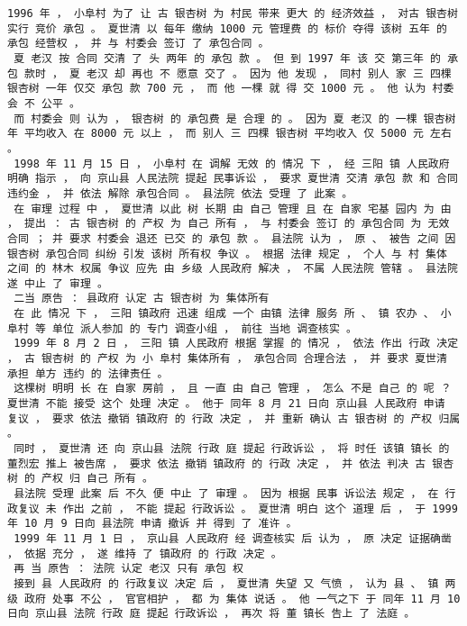 \documentclass{article}
\begin{document}
\begin{Verbatim}[commandchars=\\\{\}]
 1996 年 ， 小阜村 为了 让 古 银杏树 为 村民 带来 更大 的 经济效益 ， 对古 银杏树 实行 竞价 承包 。 夏世清 以 每年 缴纳 1000 元 管理费 的 标价 夺得 该树 五年 的 承包 经营权 ， 并 与 村委会 签订 了 承包合同 。 
 夏 老汉 按 合同 交清 了 头 两年 的 承包 款 。 但 到 1997 年 该 交 第三年 的 承包 款时 ， 夏 老汉 却 再也 不 愿意 交了 。 因为 他 发现 ， 同村 别人 家 三 四棵 银杏树 一年 仅交 承包 款 700 元 ， 而 他 一棵 就 得 交 1000 元 。 他 认为 村委会 不 公平 。 
 而 村委会 则 认为 ， 银杏树 的 承包费 是 合理 的 。 因为 夏 老汉 的 一棵 银杏树 年 平均收入 在 8000 元 以上 ， 而 别人 三 四棵 银杏树 平均收入 仅 5000 元 左右 。 
 1998 年 11 月 15 日 ， 小阜村 在 调解 无效 的 情况 下 ， 经 三阳 镇 人民政府 明确 指示 ， 向 京山县 人民法院 提起 民事诉讼 ， 要求 夏世清 交清 承包 款 和 合同 违约金 ， 并 依法 解除 承包合同 。 县法院 依法 受理 了 此案 。 
 在 审理 过程 中 ， 夏世清 以此 树 长期 由 自己 管理 且 在 自家 宅基 园内 为 由 ， 提出 ： 古 银杏树 的 产权 为 自己 所有 ， 与 村委会 签订 的 承包合同 为 无效 合同 ； 并 要求 村委会 退还 已交 的 承包 款 。 县法院 认为 ， 原 、 被告 之间 因 银杏树 承包合同 纠纷 引发 该树 所有权 争议 。 根据 法律 规定 ， 个人 与 村 集体 之间 的 林木 权属 争议 应先 由 乡级 人民政府 解决 ， 不属 人民法院 管辖 。 县法院 遂 中止 了 审理 。 
 二当 原告 ： 县政府 认定 古 银杏树 为 集体所有 
 在 此 情况 下 ， 三阳 镇政府 迅速 组成 一个 由镇 法律 服务 所 、 镇 农办 、 小阜村 等 单位 派人参加 的 专门 调查小组 ， 前往 当地 调查核实 。 
 1999 年 8 月 2 日 ， 三阳 镇 人民政府 根据 掌握 的 情况 ， 依法 作出 行政 决定 ， 古 银杏树 的 产权 为 小 阜村 集体所有 ， 承包合同 合理合法 ， 并 要求 夏世清 承担 单方 违约 的 法律责任 。 
 这棵树 明明 长 在 自家 房前 ， 且 一直 由 自己 管理 ， 怎么 不是 自己 的 呢 ？ 夏世清 不能 接受 这个 处理 决定 。 他于 同年 8 月 21 日向 京山县 人民政府 申请 复议 ， 要求 依法 撤销 镇政府 的 行政 决定 ， 并 重新 确认 古 银杏树 的 产权 归属 。 
 同时 ， 夏世清 还 向 京山县 法院 行政 庭 提起 行政诉讼 ， 将 时任 该镇 镇长 的 董烈宏 推上 被告席 ， 要求 依法 撤销 镇政府 的 行政 决定 ， 并 依法 判决 古 银杏树 的 产权 归 自己 所有 。 
 县法院 受理 此案 后 不久 便 中止 了 审理 。 因为 根据 民事 诉讼法 规定 ， 在 行政复议 未 作出 之前 ， 不能 提起 行政诉讼 。 夏世清 明白 这个 道理 后 ， 于 1999 年 10 月 9 日向 县法院 申请 撤诉 并 得到 了 准许 。 
 1999 年 11 月 1 日 ， 京山县 人民政府 经 调查核实 后 认为 ， 原 决定 证据确凿 ， 依据 充分 ， 遂 维持 了 镇政府 的 行政 决定 。 
 再 当 原告 ： 法院 认定 老汉 只有 承包 权 
 接到 县 人民政府 的 行政复议 决定 后 ， 夏世清 失望 又 气愤 ， 认为 县 、 镇 两级 政府 处事 不公 ， 官官相护 ， 都 为 集体 说话 。 他 一气之下 于 同年 11 月 10 日向 京山县 法院 行政 庭 提起 行政诉讼 ， 再次 将 董 镇长 告上 了 法庭 。 

\end{Verbatim}
\end{document}
